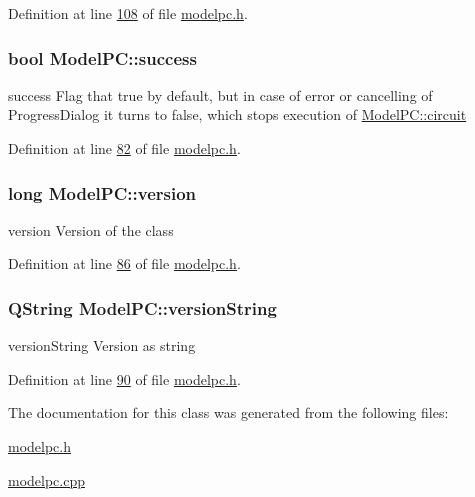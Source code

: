 Definition at line \hyperlink{modelpc_8h_source_l00108}{108} of file \hyperlink{modelpc_8h_source}{modelpc.\-h}.

\hypertarget{class_model_p_c_a945ffbbc44a832b953c191debd448f4c}{
\subsubsection[{success}]{\setlength{\rightskip}{0pt plus 5cm}bool Model\-P\-C\-::success}}\label{class_model_p_c_a945ffbbc44a832b953c191debd448f4c}


success Flag that true by default, but in case of error or cancelling of Progress\-Dialog it turns to false, which stops execution of \hyperlink{class_model_p_c_a1d0091062a0c836b283ec2f67411623b}{Model\-P\-C\-::circuit} 



Definition at line \hyperlink{modelpc_8h_source_l00082}{82} of file \hyperlink{modelpc_8h_source}{modelpc.\-h}.

\hypertarget{class_model_p_c_a5af48ab89e19be42a94c34ba00249401}{
\subsubsection[{version}]{\setlength{\rightskip}{0pt plus 5cm}long Model\-P\-C\-::version}}\label{class_model_p_c_a5af48ab89e19be42a94c34ba00249401}


version Version of the class 



Definition at line \hyperlink{modelpc_8h_source_l00086}{86} of file \hyperlink{modelpc_8h_source}{modelpc.\-h}.

\hypertarget{class_model_p_c_a5f426725ccf7eefd3c77ea8c720264c9}{
\subsubsection[{version\-String}]{\setlength{\rightskip}{0pt plus 5cm}Q\-String Model\-P\-C\-::version\-String}}\label{class_model_p_c_a5f426725ccf7eefd3c77ea8c720264c9}


version\-String Version as string 



Definition at line \hyperlink{modelpc_8h_source_l00090}{90} of file \hyperlink{modelpc_8h_source}{modelpc.\-h}.



The documentation for this class was generated from the following files\-:\begin{DoxyCompactItemize}
\item 
\hyperlink{modelpc_8h}{modelpc.\-h}\item 
\hyperlink{modelpc_8cpp}{modelpc.\-cpp}\end{DoxyCompactItemize}
